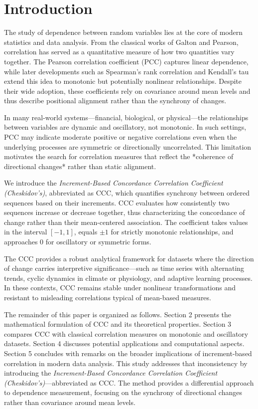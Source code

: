\documentclass[aos]{imsart}
\begin{document}

\section{Introduction}
The study of dependence between random variables lies at the core of modern statistics and data analysis. From the classical works of Galton and Pearson, correlation has served as a quantitative measure of how two quantities vary together. The Pearson correlation coefficient (PCC) captures linear dependence, while later developments such as Spearman’s rank correlation and Kendall’s tau extend this idea to monotonic but potentially nonlinear relationships. Despite their wide adoption, these coefficients rely on covariance around mean levels and thus describe positional alignment rather than the synchrony of changes.

In many real-world systems—financial, biological, or physical—the relationships between variables are dynamic and oscillatory, not monotonic. In such settings, PCC may indicate moderate positive or negative correlations even when the underlying processes are symmetric or directionally uncorrelated. This limitation motivates the search for correlation measures that reflect the *coherence of directional changes* rather than static alignment.

We introduce the \textit{Increment-Based Concordance Correlation Coefficient (Cheskidov’s)}, abbreviated as CCC, which quantifies synchrony between ordered sequences based on their increments. CCC evaluates how consistently two sequences increase or decrease together, thus characterizing the concordance of change rather than their mean-centered association. The coefficient takes values in the interval $[-1, 1]$, equals $\pm 1$ for strictly monotonic relationships, and approaches $0$ for oscillatory or symmetric forms.

The CCC provides a robust analytical framework for datasets where the direction of change carries interpretive significance—such as time series with alternating trends, cyclic dynamics in climate or physiology, and adaptive learning processes. In these contexts, CCC remains stable under nonlinear transformations and resistant to misleading correlations typical of mean-based measures.

The remainder of this paper is organized as follows. Section 2 presents the mathematical formulation of CCC and its theoretical properties. Section 3 compares CCC with classical correlation measures on monotonic and oscillatory datasets. Section 4 discusses potential applications and computational aspects. Section 5 concludes with remarks on the broader implications of increment-based correlation in modern data analysis.
This study addresses that inconsistency by introducing the \textit{Increment-Based Concordance Correlation Coefficient (Cheskidov’s)}—abbreviated as CCC. The method provides a differential approach to dependence measurement, focusing on the synchrony of directional changes rather than covariance around mean levels.
\end{document}
